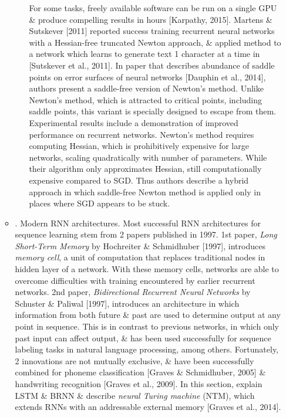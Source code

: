 \documentclass{article}
\begin{document}
\begin{enumerate}
\begin{itemize}
\begin{itemize}
			For some tasks, freely available software can be run on a single GPU \& produce compelling results in hours [Karpathy, 2015]. Martens \& Sutskever [2011] reported success training recurrent neural networks with a Hessian-free truncated Newton approach, \& applied method to a network which learns to generate text 1 character at a time in [Sutskever et al., 2011]. In paper that describes abundance of saddle points on error surfaces of neural networks [Dauphin et al., 2014], authors present a saddle-free version of Newton's method. Unlike Newton's method, which is attracted to critical points, including saddle points, this variant is specially designed to escape from them. Experimental results include a demonstration of improved performance on recurrent networks. Newton's method requires computing Hessian, which is prohibitively expensive for large networks, scaling quadratically with number of parameters. While their algorithm only approximates Hessian, still computationally expensive compared to SGD. Thus authors describe a hybrid approach in which saddle-free Newton method is applied only in places where SGD appears to be stuck.
		\end{itemize}
		\item {. Modern RNN architectures.} Most successful RNN architectures for sequence learning stem from 2 papers published in 1997. 1st paper, {\it Long Short-Term Memory} by Hochreiter \& Schmidhuber [1997], introduces {\it memory cell}, a unit of computation that replaces traditional nodes in hidden layer of a network. With these memory cells, networks are able to overcome difficulties with training encountered by earlier recurrent networks. 2nd paper, {\it Bidirectional Recurrent Neural Networks} by Schuster \& Paliwal [1997], introduces an architecture in which information from both future \& past are used to determine output at any point in sequence. This is in contrast to previous networks, in which only past input can affect output, \& has been used successfully for sequence labeling tasks in natural language processing, among others. Fortunately, 2 innovations are not mutually exclusive, \& have been successfully combined for phoneme classification [Graves \& Schmidhuber, 2005] \& handwriting recognition [Graves et al., 2009]. In this section, explain LSTM \& BRNN \& describe {\it neural Turing machine} (NTM), which extends RNNs with an addressable external memory [Graves et al., 2014].
		\begin{itemize}

\end{itemize}
\end{itemize}
\end{enumerate}
\end{document}
